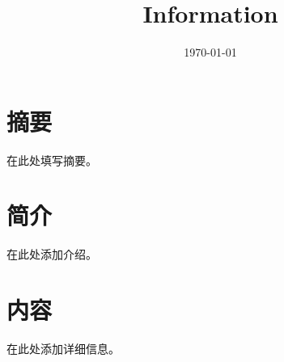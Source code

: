 \documentclass{article}
\title{Information}
\author{}
\date{\today}
\begin{document}
\maketitle

\section*{摘要}
在此处填写摘要。

\section{简介}
在此处添加介绍。

\section{内容}
在此处添加详细信息。
\end{document}
